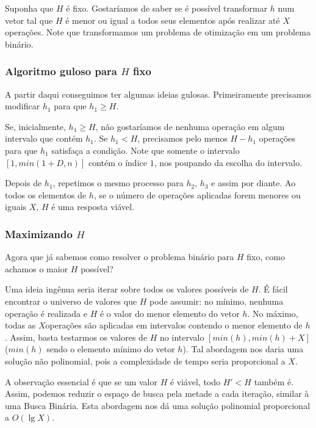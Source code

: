 Suponha que $H$ é fixo. Gostaríamos de saber se é possível transformar $h$ num vetor tal que $H$ é menor ou igual a todos seus elementos após realizar até $X$ operações. Note que transformamos um problema de otimização em um problema binário.

\subsubsection*{Algoritmo guloso para $H$ fixo}\label{subproblema:algo}

A partir daqui conseguimos ter algumas ideias gulosas. Primeiramente precisamos modificar $h_1$ para que $h_1 \geq H$.

Se, inicialmente, $h_1 \geq H$, não gostaríamos de  nenhuma operação em algum intervalo que contém $h_1$. Se $h_1 < H$, precisamos pelo menos $H - h_1$ operações para que $h_1$ satisfaça a condição. Note que somente o intervalo $[1, min(1 + D, n)]$ contém o índice $1$, nos poupando da escolha do intervalo.

Depois de  $h_1$, repetimos o mesmo processo para $h_2$, $h_3$ e assim por diante. Ao  todos os elementos de $h$, se o número de operações aplicadas forem menores ou iguais $X$, $H$ é uma resposta viável.

\subsubsection*{Maximizando $H$}

Agora que já sabemos como resolver o problema binário para $H$ fixo, como achamos o maior $H$ possível?

Uma ideia ingênua seria iterar sobre todos os valores possíveis de $H$. É fácil encontrar o universo de valores que $H$ pode assumir: no mínimo, nenhuma operação é realizada e $H$ é o valor do menor elemento do vetor $h$. No máximo, todas as $X$operações são aplicadas em intervalos contendo o menor elemento de $h$. Assim, basta testarmos os valores de $H$ no intervalo $[min(h), min(h) + X]$ ($min(h)$ sendo o elemento mínimo do vetor $h$). Tal abordagem nos daria uma solução não polinomial, pois a complexidade de tempo seria proporcional a $X$.

A observação essencial é que se um valor $H$ é viável, todo $H' < H$ também é. Assim, podemos reduzir o espaço de busca pela metade a cada iteração, similar à uma Busca Binária. Esta abordagem nos dá uma solução polinomial proporcional a $O(\lg X)$.

